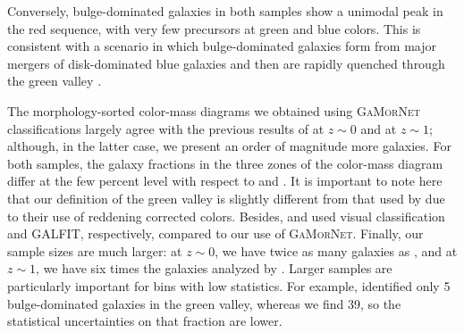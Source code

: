 \documentclass[twocolumn]{aastex63}
\newcommand\gamornet{G\textsc{a}M\textsc{or}N\textsc{et}}
\begin{document}
Conversely, bulge-dominated galaxies in both samples show a unimodal peak in the red sequence, with very few precursors at green and blue colors. 
This is consistent with a scenario in which bulge-dominated galaxies form from major mergers of disk-dominated blue galaxies and then are rapidly quenched through the green valley \citep{schawinski_14_green_herring}.

The morphology-sorted color-mass diagrams we obtained using \gamornet{} classifications largely agree with the previous results of \citet{schawinski_14_green_herring} at $z\sim0$ and \citet{powell_17} at $z \sim 1$; although, in the latter case, we present an order of magnitude more galaxies. For both samples, the galaxy fractions in the three zones of the color-mass diagram differ at the few percent level with respect to \citet{schawinski_14_green_herring} and \citet{powell_17}. It is important to note here that our definition of the green valley is slightly different from that used by \citet{schawinski_14_green_herring} due to their use of reddening corrected colors. Besides, \cite{schawinski_14_green_herring} and \cite{powell_17} used visual classification and GALFIT, respectively, compared to our use of \gamornet{}. Finally, our sample sizes are much larger: at $z \sim 0$, we have twice as many galaxies as \citet{schawinski_14_green_herring}, and at $z\sim1$, we have six times the galaxies analyzed by \citet{powell_17}. Larger samples are particularly important for bins with low statistics. For example, \cite{powell_17} identified only 5 bulge-dominated galaxies in the green valley, whereas we find 39, so the statistical uncertainties on that fraction are lower.
\end{document}
